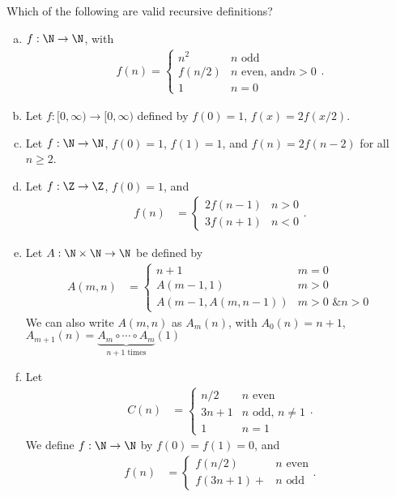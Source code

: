 \documentclass[10pt]{mypackage}
\begin{document}
\begin{question}
  Which of the following are valid recursive definitions?
  \begin{enumerate}[(a)]
    \item $f: \N\rightarrow \N$, with
      \begin{align*}
      f(n) = \begin{cases}
        n^2  & n\text{ odd}\\
        f\left(n/2\right) & n\text{ even, and} n>0\\
        1 & n=0
    \end{cases}.
    \end{align*}
  \item Let $f: [0,\infty)\rightarrow [0,\infty)$ defined by $f(0) = 1$, $f(x) = 2f(x/2)$.
  \item Let $f: \N\rightarrow \N$, $f(0) = 1$, $f(1) = 1$, and $f(n) = 2f(n-2)$ for all $n\geq 2$.
  \item Let $f: \Z\rightarrow \Z$, $f(0)  =1$, and
    \begin{align*}
      f(n) &= \begin{cases}
        2f(n-1) & n > 0\\
        3f(n+1) & n < 0
      \end{cases}.
    \end{align*}
  \item Let $A: \N\times \N\rightarrow \N$ be defined by
    \begin{align*}
      A\left(m,n\right) &= \begin{cases}
        n+1 & m=0\\
        A\left(m-1,1\right) & m > 0\\
        A\left(m-1,A\left(m,n-1\right)\right) & m > 0 \text{ \& } n > 0
      \end{cases}
    \end{align*}
    We can also write $A(m,n)$ as $A_m(n)$, with $A_0(n) = n+1$, $A_{m+1}(n) = \underbrace{A_m\circ \cdots \circ A_m}_{\text{$n+1$ times}}(1)$
  \item Let 
    \begin{align*}
      C(n) &= \begin{cases}
        n/2 & n\text{ even}\\
        3n + 1 & n\text{ odd, $n\neq 1$}\\
        1 & n = 1
      \end{cases}.
    \end{align*}
    We define $f: \N\rightarrow \N$ by $f(0) = f(1) = 0$, and
    \begin{align*}
      f(n) &= \begin{cases}
        f(n/2) & n\text{ even}\\
        f(3n+1) +  & n\text{ odd}
      \end{cases}.
    \end{align*}
  \end{enumerate}
\end{question}
\end{document}
